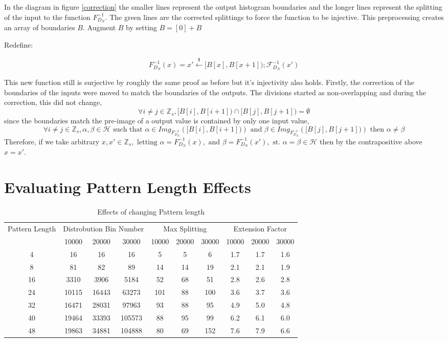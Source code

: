 \documentclass[10pt,a4paper]{article}
\begin{document}
In the diagram in figure \ref{correction} the smaller lines represent the output histogram boundaries and the longer lines represent the splitting of the input to the function $F^{-1}_{D_N}$.
The green lines are the corrected splittings to force the function to be injective. This preprocessing creates an array of boundaries $B$. Augment $B$ by setting $B = [0] + B$

Redefine:

$$F^{-1}_{D_N}(x) = x' \xleftarrow{\$} [B[x], B[x+1]); \mathcal{F}^{-1}_{D_N}(x')$$

This new function still is surjective by roughly the same proof as before but it's injectivity also holds.
Firstly, the correction of the boundaries of the inputs were moved to match the boundaries of the outputs.
The divisions started as non-overlapping and during the correction, this did not change, 
$$\forall i \neq j \in \mathbb{Z}_s, \big[ B[i],B[i+1] \big) \cap \big[ B[j],B[j+1] \big) = \emptyset$$
since the boundaries match the pre-image of a output value is contained by only one input value,
$$ \forall i \neq j \in \mathbb{Z}_s, \alpha,\beta \in \mathcal{H} \text{ such that } \alpha \in Img_{F^{-1}_{D_N}}(\big[ B[i],B[i+1] \big)) \text{ and } \beta \in Img_{F^{-1}_{D_N}}(\big[ B[j],B[j+1] \big)) \text{ then } \alpha \neq \beta$$
Therefore, if we take arbitrary $x, x' \in \mathbb{Z}_s, \text{ letting } \alpha = F^{-1}_{D_N}(x), \text{ and } \beta = F^{-1}_{D_N}(x'), \text{ st. } \alpha = \beta \in \mathcal{H}$ then by the contrapositive above $x=x'$.

\pagebreak
\section{Evaluating Pattern Length Effects}\label{sec:gran}

\begin{table}[h]
\centering
\begin{tabular}{|c|c|c|c|c|c|c|c|c|c|}
\hline
\multirow{2}{*}{Pattern Length}&
\multicolumn{3}{|c|}{Distrobution Bin Number}&
\multicolumn{3}{|c|}{Max Splitting}&
\multicolumn{3}{|c|}{Extension Factor}\\
\cline{2-10}
&10000&20000&30000&10000&20000&30000&10000&20000&30000\\
\hline
4 	& 16&16&16 				& 5&5&6 		& 1.7&1.7&1.6\\
8 	& 81&82&89 				& 14&14&19		& 2.1&2.1&1.9\\
16 	& 3310&3906&5184 		& 52&68&51 		& 2.8&2.6&2.8\\
24 	& 10115&16443&63273 	& 101&88&100 	& 3.6&3.7&3.6\\
32 	& 16471&28031&97963 	& 93&88&95 		& 4.9&5.0&4.8\\
40 	& 19464&33393&105573 	& 88&95&99 		& 6.2&6.1&6.0\\
48 	& 19863&34881&104888 	& 80&69&152 	& 7.6&7.9&6.6\\
\hline
\end{tabular}
\caption{Effects of changing Pattern length}
\label{tab:patlen}
\end{table}
\end{document}
